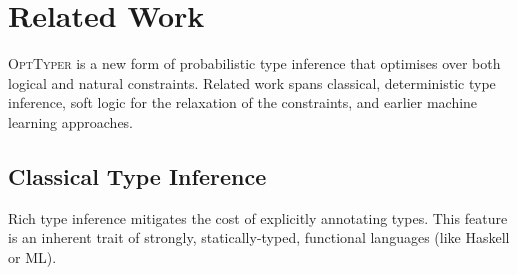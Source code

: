 \documentclass[acmsmall, review, anonymous]{acmart}\settopmatter{printfolios=true,printccs=false,printacmref=false}
\newcommand{\projectname}{\textsc{OptTyper}\xspace}
\newcommand{\margincomment}[2]{\marginpar{\scriptsize\color{Maroon}#1 says: #2}}
\newcommand{\adg}[1]{\margincomment{ADG}{#1}}
\newcommand{\etb}[1]{\margincomment{Earl}{#1}}
\begin{document}


\section{Related Work}\label{sec:related}

\projectname is a new form of probabilistic type inference that optimises over
both logical and natural constraints.  Related work spans classical, deterministic
type inference, soft logic for the relaxation of the constraints, and earlier machine learning approaches.

\subsection{Classical Type Inference}


Rich type inference mitigates the cost
of explicitly annotating types. This feature is an
inherent trait of strongly, statically-typed, functional languages (like Haskell or ML).

\end{document}
